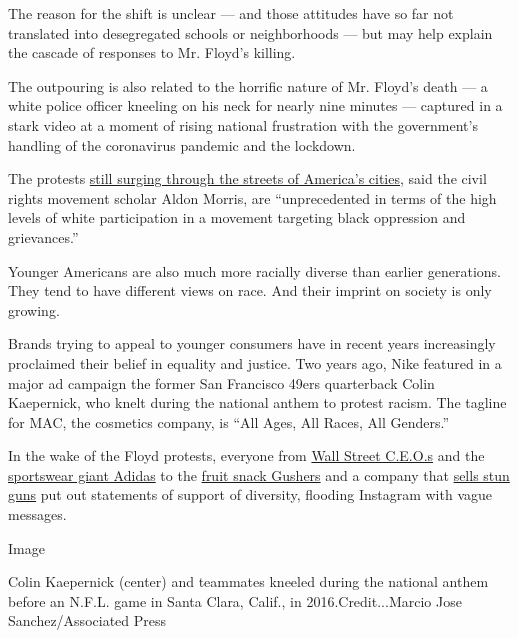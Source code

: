 The reason for the shift is unclear --- and those attitudes have so far
not translated into desegregated schools or neighborhoods --- but may
help explain the cascade of responses to Mr. Floyd's killing.

The outpouring is also related to the horrific nature of Mr. Floyd's
death --- a white police officer kneeling on his neck for nearly nine
minutes --- captured in a stark video at a moment of rising national
frustration with the government's handling of the coronavirus pandemic
and the lockdown.

The protests
\href{https://www.nytimes3xbfgragh.onion/interactive/2020/06/13/us/george-floyd-protests-cities-photos.html?action=click\&module=Top\%20Stories\&pgtype=Homepage}{still
surging through the streets of America's cities}, said the civil rights
movement scholar Aldon Morris, are ``unprecedented in terms of the high
levels of white participation in a movement targeting black oppression
and grievances.''

Younger Americans are also much more racially diverse than earlier
generations. They tend to have different views on race. And their
imprint on society is only growing.

Brands trying to appeal to younger consumers have in recent years
increasingly proclaimed their belief in equality and justice. Two years
ago, Nike featured in a major ad campaign the former San Francisco 49ers
quarterback Colin Kaepernick, who knelt during the national anthem to
protest racism. The tagline for MAC, the cosmetics company, is ``All
Ages, All Races, All Genders.''

In the wake of the Floyd protests, everyone from
\href{https://www.cnbc.com/2020/06/01/wall-street-ceos-speak-out-about-george-floyd-and-protests-rocking-us-cities.html}{Wall
Street C.E.O.s} and the
\href{https://www.nytimes3xbfgragh.onion/2020/06/10/business/adidas-black-employees-discrimination.html?searchResultPosition=1}{sportswear
giant Adidas} to the
\href{https://www.themarysue.com/gushers-finally-weighs-in-on-black-lives-matter/}{fruit
snack Gushers} and a company that
\href{https://www.axon.com/news/axon-statement-on-the-death-of-george-floyd}{sells
stun guns} put out statements of support of diversity, flooding
Instagram with vague messages.

Image

Colin Kaepernick (center) and teammates kneeled during the national
anthem before an N.F.L. game in Santa Clara, Calif., in
2016.Credit...Marcio Jose Sanchez/Associated Press

